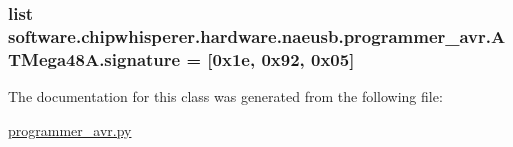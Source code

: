 \subsubsection[{signature}]{\setlength{\rightskip}{0pt plus 5cm}list software.\+chipwhisperer.\+hardware.\+naeusb.\+programmer\+\_\+avr.\+A\+T\+Mega48\+A.\+signature = \mbox{[}0x1e, 0x92, 0x05\mbox{]}\hspace{0.3cm}{\ttfamily [static]}}\label{classsoftware_1_1chipwhisperer_1_1hardware_1_1naeusb_1_1programmer__avr_1_1ATMega48A_a73f9271d45e7959dc26f0099f160b0d3}


The documentation for this class was generated from the following file\+:\begin{DoxyCompactItemize}
\item 
\hyperlink{programmer__avr_8py}{programmer\+\_\+avr.\+py}\end{DoxyCompactItemize}
